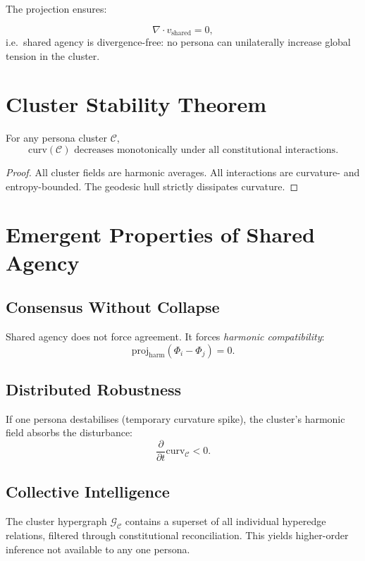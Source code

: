 The projection ensures:

\[
\nabla \cdot v_{\mathrm{shared}} = 0,
\]
i.e.\ shared agency is divergence-free:
no persona can unilaterally increase global tension in the cluster.


\section{Cluster Stability Theorem}

\begin{theorem}
For any persona cluster $\mathcal{C}$,
\[
\mathrm{curv}(\mathcal{C})
\text{ decreases monotonically under all constitutional interactions}.
\]
\end{theorem}

\begin{proof}
All cluster fields are harmonic averages.
All interactions are curvature- and entropy-bounded.
The geodesic hull strictly dissipates curvature.
\end{proof}


\section{Emergent Properties of Shared Agency}

\subsection{Consensus Without Collapse}

Shared agency does not force agreement.
It forces \emph{harmonic compatibility}:
\[
\mathrm{proj}_{\mathrm{harm}}(\Phi_i - \Phi_j) = 0.
\]

\subsection{Distributed Robustness}

If one persona destabilises (temporary curvature spike), the cluster’s harmonic 
field absorbs the disturbance:
\[
\frac{\partial}{\partial t}\mathrm{curv}_{\mathcal{C}} < 0.
\]

\subsection{Collective Intelligence}

The cluster hypergraph $\mathcal{G}_{\mathcal{C}}$ contains a superset of all 
individual hyperedge relations, filtered through constitutional reconciliation.
This yields higher-order inference not available to any one persona.


